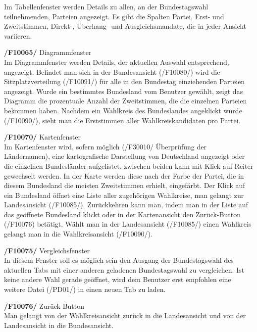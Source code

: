 \documentclass[10pt,a4paper]{article}
\begin{document}
\begin{description}
	Im Tabellenfenster werden Details zu allen, an der Bundestagswahl teilnehmenden, Parteien angezeigt.
	Es gibt die Spalten Partei, Erst- und Zweitstimmen, Direkt-, Überhang- und Ausgleichsmandate, die in jeder Ansicht variieren. \hfill \\
	\item \textbf{/F10065/} Diagrammfenster \hfill \\
	Im Diagrammfenster werden Details, der aktuellen Auswahl entsprechend, angezeigt. Befindet man sich in der Bundesansicht (/F10080/) wird die Sitzplatzverteilung (/F10091/) für alle in den Bundestag einziehenden Parteien angezeigt. Wurde ein bestimmtes Bundesland vom Benutzer gewählt, zeigt das Diagramm die prozentuale Anzahl der Zweitstimmen, die die einzelnen Parteien bekommen haben. Nachdem ein Wahlkreis des Bundeslandes angeklickt wurde (/F10090/), sieht man die Erststimmen aller Wahlkreiskandidaten pro Partei. \hfill \\
	\item \textbf{/F10070/} Kartenfenster \hfill \\
	Im Kartenfenster wird, sofern möglich (/F30010/ Überprüfung der Ländernamen), eine kartografische Darstellung von Deutschland angezeigt oder die einzelnen Bundesländer aufgelistet, zwischen beiden kann mit Klick auf Reiter gewechselt werden. In der Karte werden diese nach der Farbe der Partei, die in diesem Bundesland die meisten Zweitstimmen erhielt, eingefärbt. Der Klick auf ein Bundesland öffnet eine Liste aller zugehörigen Wahlkreise, man gelangt zur Landesansicht (/F10085/). Zurückkehren kann man, indem man in der Liste auf das geöffnete Bundesland klickt oder in der Kartenansicht den Zurück-Button (/F10076) betätigt. Wählt man in der Landesansicht (/F10085/) einen Wahlkreis gelangt man in die Wahlkreisansicht (/F10090/). \hfill \\
	\item \textbf{/F10075/} Vergleichsfenster \hfill \\
	In diesem Fenster soll es möglich sein den Ausgang der Bundestagswahl des aktuellen Tabs mit einer anderen geladenen Bundestagswahl zu vergleichen. Ist keine andere Wahl gerade geöffnet, wird dem Benutzer erst empfohlen eine weitere Datei (/PD01/) in einen neuen Tab zu laden. \hfill \\
	\item \textbf{/F10076/} Zurück Button\hfill \\
	Man gelangt von der Wahlkreisansicht zurück in die Landesansicht und von der Landesansicht in die Bundesansicht. \hfill \\

\end{description}
\end{document}
